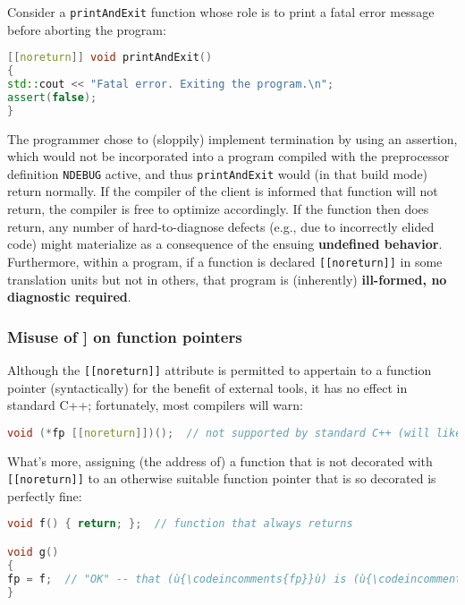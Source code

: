 Consider a \texttt{printAndExit} function whose role is to print a fatal
error message before aborting the program:

\begin{lstlisting}[language=C++]
[[noreturn]] void printAndExit()
{
std::cout << "Fatal error. Exiting the program.\n";
assert(false);
}
\end{lstlisting}

\noindent The programmer chose to (sloppily) implement termination by using an
assertion, which would not be incorporated into a program compiled with
the preprocessor definition \texttt{NDEBUG} active, and thus
\texttt{printAndExit} would (in that build mode) return normally. If the
compiler of the client is informed that function will not return, the compiler is
free to optimize accordingly. If the function then does return, any
number of hard-to-diagnose defects (e.g., due to incorrectly elided
code) might materialize as a consequence of the ensuing
\textbf{undefined behavior}. Furthermore, within a program, if a function is declared \texttt{[[noreturn]]} in some
translation units but not in others, that program is (inherently)
\textbf{ill-formed, no diagnostic required}.

\subsubsection[Misuse of {\tt[[noreturn]]} on function pointers]{Misuse of {\ParaCode [[noreturn]]} on function pointers}\label{misuse-of-[[noreturn]]-on-function-pointers}

Although the \texttt{[[noreturn]]} attribute is permitted to appertain
to a function pointer (syntactically) for the benefit of external tools,
it has no effect in standard C++; fortunately, most compilers will warn:

\begin{lstlisting}[language=C++]
void (*fp [[noreturn]])();  // not supported by standard C++ (will likely warn)
\end{lstlisting}

\noindent What's more, assigning (the address of) a function
that is not decorated with \texttt{[[noreturn]]} to an otherwise
suitable function pointer that is so decorated is perfectly fine:

\begin{lstlisting}[language=C++]
void f() { return; };  // function that always returns

void g()
{
fp = f;  // "OK" -- that (ù{\codeincomments{fp}}ù) is (ù{\codeincomments{[[noreturn]]}}ù) is silently ignored
}
\end{lstlisting}

